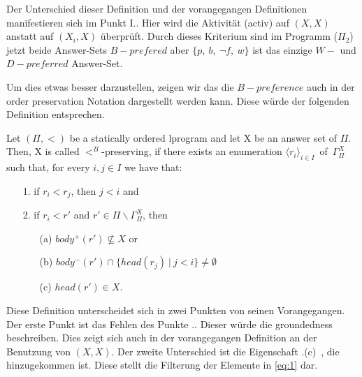 Der Unterschied dieser Definition und der vorangegangen Definitionen manifestieren sich im Punkt \glqq I.\grqq. Hier wird die Aktivität (activ) auf $(X,X)$ anstatt auf $(X_i,X)$ überprüft. Durch dieses Kriterium sind im Programm ($\Pi_2$) jetzt beide Answer-Sets $B-prefered$ aber $\{p,~b,~\neg f,~w\}$ ist das einzige $W-$ und $D-preferred$ Answer-Set.\

Um dies etwas besser darzustellen, zeigen wir das die $B-preference$ auch in der order preservation Notation dargestellt werden kann. Diese würde der folgenden Definition entsprechen.\\

\begin{definition}
  Let $(\Pi, <)$ be a statically ordered lprogram and let X be an answer set of $\Pi$.
  Then, X is called $<^B$-preserving, if there exists an enumeration
  $\langle r_i \rangle_{i \in I}$~of~$\Gamma_{\Pi}^X$ such that, for every $i, j \in I$
  we have that:
  \begin{itemize}
		\item[1.] if $r_i < r_j$, then $j<i$ and \\
    \item[2.] if $r_i < r'$ and $r' \in \Pi \backslash \Gamma_{\Pi}^X$, then
      \begin{itemize}
        \item[(a)] $body^+(r') \not \subseteq X$ or
        \item[(b)] $body^-(r') \cap \{head(r_j)~|~j<i\} \not = \emptyset$
				\item[(c)] $head(r') \in X.$
      \end{itemize}
  \end{itemize}
\end{definition}

Diese Definition unterscheidet sich in zwei Punkten von seinen Vorangegangen.
Der erste Punkt ist das Fehlen des Punkte .\grqq.
Dieser würde die \glqq groundedness\grqq~ beschreiben.
Dies zeigt sich auch in der vorangegangen Definition an der Benutzung von $(X,X)$.
Der zweite Unterschied ist die Eigenschaft .(c)\grqq~, die
hinzugekommen ist. Diese stellt die Filterung der Elemente in \eqref{eq:1} dar.
